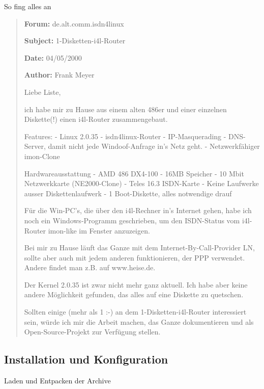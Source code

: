 \documentclass[t]{beamer}
\makeatletter
\newcommand{\strong}[1]{\@strong{#1}}
\newcommand{\@@strong}[1]{\textbf{\let\@strong\@@@strong#1}}
\newcommand{\@@@strong}[1]{\textnormal{\let\@strong\@@strong#1}}
\let\@strong\@@strong
\makeatother
\begin{document}
\begin{frame}{So fing alles an}
    \blockquote{\footnotesize%
\strong{Forum:} de.alt.comm.isdn4linux

\strong{Subject:} 1-Disketten-i4l-Router

\strong{Date:} 04/05/2000

\strong{Author:} Frank Meyer
\scriptsize

Liebe Liste,

ich habe mir zu Hause aus einem alten 486er und einer einzelnen Diskette(!)
einen i4l-Router zusammengebaut.

Features:
- Linux 2.0.35
- isdn4linux-Router
- IP-Masquerading
- DNS-Server, damit nicht jede Windoof-Anfrage in's Netz geht.
- Netzwerkfähiger imon-Clone

Hardwareausstattung
- AMD 486 DX4-100
- 16MB Speicher
- 10 Mbit Netzwerkkarte (NE2000-Clone)
- Teles 16.3 ISDN-Karte
- Keine Laufwerke ausser Diskettenlaufwerk
- 1 Boot-Diskette, alles notwendige drauf

Für die Win-PC's, die über den i4l-Rechner in's Internet gehen, habe
ich noch ein Windows-Programm geschrieben, um den ISDN-Status vom
i4l-Router imon-like im Fenster anzuzeigen.

Bei mir zu Hause läuft das Ganze mit dem Internet-By-Call-Provider LN,
sollte aber auch mit jedem anderen funktionieren, der PPP verwendet.
Andere findet man z.B. auf www.heise.de.

Der Kernel 2.0.35 ist zwar nicht mehr ganz aktuell. Ich habe aber keine
andere Möglichkeit gefunden, das alles auf eine Diskette zu quetschen.

Sollten einige (mehr als 1 :-) an dem 1-Disketten-i4l-Router
interessiert sein, würde ich mir die Arbeit machen, das Ganze
dokumentieren und als Open-Source-Projekt zur Verfügung stellen.
    }
\end{frame}

\subsection{Installation und Konfiguration}

\begin{frame}{Laden und Entpacken der Archive}
\end{frame}
\end{document}
